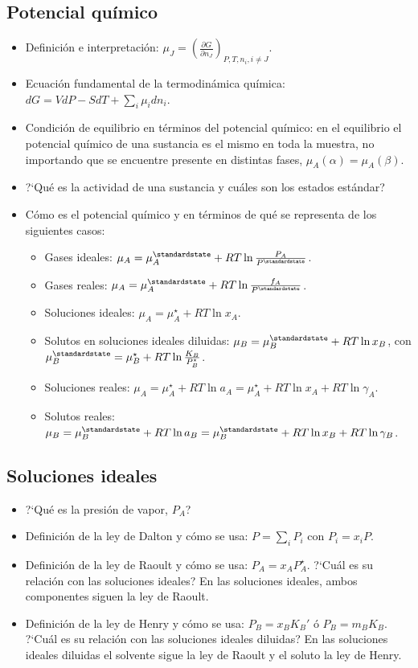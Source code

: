 \documentclass[a4paper,12pt]{article}
\begin{document}
\subsection*{Potencial qu\'imico}

\begin{itemize}
 \item Definici\'on e interpretaci\'on: $\mu_J=\left(\frac{\partial G}{\partial n_J}\right)_{P,T,n_i,i\neq J}$.
 \item Ecuaci\'on fundamental de la termodin\'amica qu\'imica: $dG=VdP-SdT+\sum_i \mu_idn_i$.
 \item Condici\'on de equilibrio en t\'erminos del potencial qu\'imico: en el equilibrio el potencial qu\'imico de una sustancia es el mismo en toda la muestra, no importando que se encuentre presente en distintas fases, $\mu_A(\alpha)=\mu_A(\beta)$.
 \item ?`Qu\'e es la actividad de una sustancia y cu\'ales son los estados est\'andar?
 \item C\'omo es el potencial qu\'imico y en t\'erminos de qu\'e se representa de los siguientes casos:
 \begin{itemize}
  \item Gases ideales: $\mu_A=\mu_A^\standardstate+RT\ln\frac{P_A}{P^\standardstate}$.
  \item Gases reales: $\mu_A=\mu_A^\standardstate+RT\ln\frac{f_A}{P^\standardstate}$.
  \item Soluciones ideales: $\mu_A=\mu_A^\star+RT\ln x_A$.
  \item Solutos en soluciones ideales diluidas: $\mu_B=\mu_B^\standardstate+RT\ln x_B$, con $\mu_B^\standardstate=\mu_B^\star+RT\ln\frac{K_B}{P_B^\star}$.
  \item Soluciones reales: $\mu_A=\mu_A^\star+RT\ln a_A=\mu_A^\star+RT\ln x_A+RT\ln\gamma_A$.
  \item Solutos reales: $\mu_B=\mu_B^\standardstate+RT\ln a_B=\mu_B^\standardstate+RT\ln x_B+RT\ln\gamma_B$.
 \end{itemize}
\end{itemize}

\subsection*{Soluciones ideales}

\begin{itemize}
 \item ?`Qu\'e es la presi\'on de vapor, $P_A$?
 \item Definici\'on de la ley de Dalton y c\'omo se usa: $P=\sum_iP_i$ con $P_i=x_iP$.
 \item Definici\'on de la ley de Raoult y c\'omo se usa: $P_A=x_AP_A^\star$. ?`Cu\'al es su relaci\'on con las soluciones ideales? En las soluciones ideales, ambos componentes siguen la ley de Raoult.
 \item Definici\'on de la ley de Henry y c\'omo se usa: $P_B=x_BK_B'$ \'o $P_B=m_BK_B$. ?`Cu\'al es su relaci\'on con las soluciones ideales diluidas? En las soluciones ideales diluidas el solvente sigue la ley de Raoult y el soluto la ley de Henry.
\end{itemize}
\end{document}
